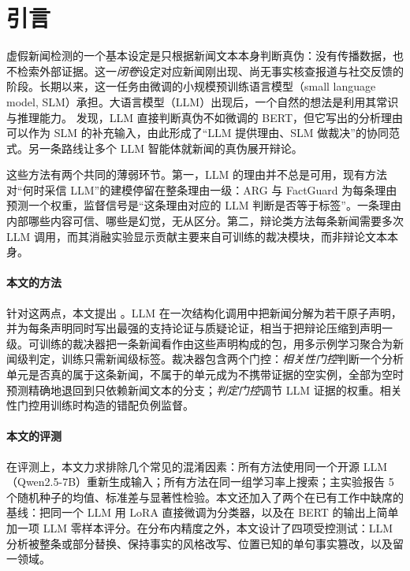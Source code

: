 \section{引言}\label{sec:intro}

虚假新闻检测的一个基本设定是只根据新闻文本本身判断真伪：没有传播数据，也不检索外部证据。这一\emph{闭卷}设定对应新闻刚出现、尚无事实核查报道与社交反馈的阶段。长期以来，这一任务由微调的小规模预训练语言模型（small language model, SLM）承担\citep{shu2017fake,devlin2019bert}。大语言模型（LLM）出现后，一个自然的想法是利用其常识与推理能力。\citet{hu2024bad} 发现，LLM 直接判断真伪不如微调的 BERT，但它写出的分析理由可以作为 SLM 的补充输入，由此形成了“LLM 提供理由、SLM 做裁决”的协同范式\citep{hu2024bad,he2026factguard,liu2024teller,nan2024genfend}。另一条路线让多个 LLM 智能体就新闻的真伪展开辩论\citep{liu2025ted,han2025d2d}。

这些方法有两个共同的薄弱环节。第一，LLM 的理由并不总是可用，现有方法对“何时采信 LLM”的建模停留在整条理由一级：ARG 与 FactGuard 为每条理由预测一个权重，监督信号是“这条理由对应的 LLM 判断是否等于标签”。一条理由内部哪些内容可信、哪些是幻觉，无从区分。第二，辩论类方法每条新闻需要多次 LLM 调用，而其消融实验显示贡献主要来自可训练的裁决模块，而非辩论文本本身\citep{liu2025ted}。

\paragraph{本文的方法}
针对这两点，本文提出 \method{}。LLM 在一次结构化调用中把新闻分解为若干原子声明，并为每条声明同时写出最强的支持论证与质疑论证，相当于把辩论压缩到声明一级。可训练的裁决器把一条新闻看作由这些声明构成的包，用多示例学习聚合为新闻级判定，训练只需新闻级标签。裁决器包含两个门控：\emph{相关性门控}判断一个分析单元是否真的属于这条新闻，不属于的单元成为不携带证据的空实例，全部为空时预测精确地退回到只依赖新闻文本的分支；\emph{判定门控}调节 LLM 证据的权重。相关性门控用训练时构造的错配负例监督。

\paragraph{本文的评测}
在评测上，本文力求排除几个常见的混淆因素：所有方法使用同一个开源 LLM（Qwen2.5-7B）重新生成输入；所有方法在同一组学习率上搜索；主实验报告 5 个随机种子的均值、标准差与显著性检验。本文还加入了两个在已有工作中缺席的基线：把同一个 LLM 用 LoRA 直接微调为分类器，以及在 BERT 的输出上简单加一项 LLM 零样本评分。在分布内精度之外，本文设计了四项受控测试：LLM 分析被整条或部分替换、保持事实的风格改写、位置已知的单句事实篡改，以及留一领域。

